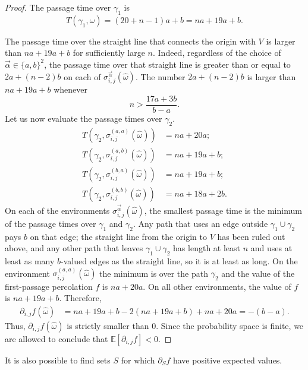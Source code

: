 \documentclass[reqno]{amsart}
\begin{document}
\begin{proof}
The passage time over $\gamma_1$ is 
\[T(\gamma_1,\hat\omega)=(20+n-1)a+b=na+19a+b.\]

The passage time over the straight line that connects the origin with $V$ is larger than $na+19a+b$ for sufficiently large $n$. Indeed, regardless of the choice of 
$\overrightarrow\alpha\in\{a,b\}^2$, 
the passage time over that straight line is greater than or equal to $2a+(n-2)b$ on each of $\sigma_{i,j}^{\overrightarrow \alpha}(\hat\omega)$. The number $2a+(n-2)b$ is larger than $na+19a+b$ whenever \[n>\frac{17a+3b}{b-a}.\]
Let us now evaluate the passage times over $\gamma_2$. 
\begin{align*}
T\left(\gamma_2,\sigma^{(a,a)}_{i,j}(\hat\omega)\right) &= na+20a;\\
T\left(\gamma_2,\sigma^{(a,b)}_{i,j}(\hat\omega)\right) &= na+19a+b;\\
T\left(\gamma_2,\sigma^{(b,a)}_{i,j}(\hat\omega)\right) &= na+19a+b;\\
T\left(\gamma_2,\sigma^{(b,b)}_{i,j}(\hat\omega)\right) &= na+18a+2b.
\end{align*}
On each of the environments $\sigma_{i,j}^{\overrightarrow \alpha}(\hat\omega)$, the smallest passage time is the minimum of the passage times over $\gamma_1$ and $\gamma_2$. Any path that uses an edge outside $\gamma_1 \cup \gamma_2$ pays $b$ on that edge; the straight line from the origin to $V$ has been ruled out above, and any other path that leaves $\gamma_1 \cup \gamma_2$ has length at least $n$ and uses at least as many $b$-valued edges as the straight line, so it is at least as long.
 On the environment $\sigma^{(a,a)}_{i,j}(\hat\omega)$ the minimum is over the path $\gamma_2$ and the value of the first-passage percolation $f$ is $na+20a$. On all other environments, the value of $f$ is $na+19a+b$. Therefore, 
\begin{align*}
\partial_{i,j}f(\hat\omega) &= na+19a+b-2(na+19a+b)+na+20a=-(b -a).
\end{align*}
Thus, $\partial_{i,j}f(\hat \omega)$ is strictly smaller than $0$. 
Since the probability space is finite, we are allowed to conclude that $\mathbb E[\partial_{i,j}f]<0$. 
\end{proof}

It is also possible to find sets $S$ for which $\partial_Sf$ have positive expected values. 
\end{document}
